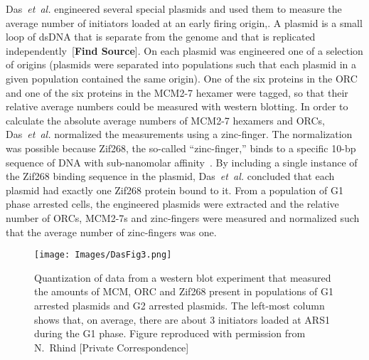 {		Das~\emph{et~al.} engineered several special plasmids and used them to measure the average number of initiators loaded at an early firing origin,.
		A plasmid is a small loop of dsDNA that is separate from the genome and that is replicated independently~[\textbf{Find Source}].
		On each plasmid was engineered one of a selection of origins (plasmids were separated into populations such that each plasmid in a given population contained the same origin).
		One of the six proteins in the ORC and one of the six proteins in the MCM2-7 hexamer were tagged, so that their relative average numbers could be measured with western blotting.
		In order to calculate the absolute average numbers of MCM2-7 hexamers and ORCs, Das~\emph{et~al.} normalized the measurements using a zinc-finger.
		The normalization was possible because Zif268, the so-called ``zinc-finger,'' binds to a specific 10-bp sequence of DNA with sub-nanomolar affinity~\cite{ZincFingers}.
		By including a single instance of the Zif268 binding sequence in the plasmid, Das~\emph{et~al.} concluded that each plasmid had exactly one Zif268 protein bound to it.
		From a population of G1 phase arrested cells, the engineered plasmids were extracted and the relative number of ORCs, MCM2-7s and zinc-fingers were measured and normalized such that the average number of zinc-fingers was one.
		
		\begin{SCfigure}[1][tbh]
			\texttt{[image: Images/DasFig3.png]}
			\caption[Absolute number of loaded MCMs at ARS1]{\label{fig:Das3} Quantization of data from a western blot experiment that measured the amounts of MCM, ORC and Zif268 present in populations of G1 arrested plasmids and G2 arrested plasmids.
				The left-most column shows that, on average, there are about 3 initiators loaded at ARS1 during the G1 phase.
				Figure reproduced with permission from N.~Rhind [Private Correspondence]~\cite{Rhind}}
		\end{SCfigure}
		
}
